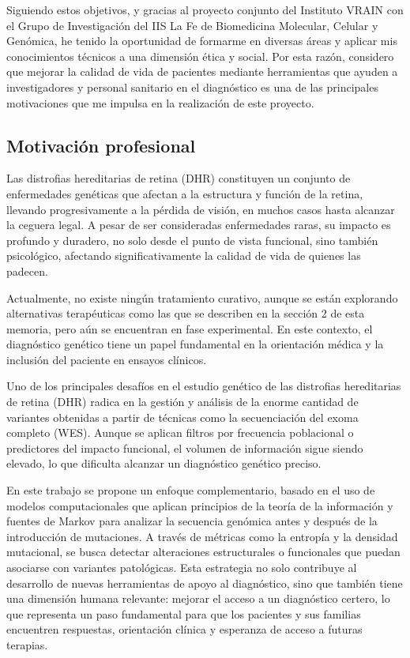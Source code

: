 \documentclass[11pt,spanish,listoffigures,listoftables]{tfgetsinf}
\begin{document}
Siguiendo estos objetivos, y gracias al proyecto conjunto del Instituto VRAIN con el Grupo de Investigación del \ac{IIS} La Fe de Biomedicina Molecular, Celular y Genómica, he tenido la oportunidad de formarme en diversas áreas y aplicar mis conocimientos técnicos a una dimensión ética y social. Por esta razón, considero que mejorar la calidad de vida de pacientes mediante herramientas que ayuden a investigadores y personal sanitario en el diagnóstico es una de las principales motivaciones que me impulsa en la realización de este proyecto. 

\subsection{Motivación profesional}
Las distrofias hereditarias de retina (\ac{DHR}) constituyen un conjunto de enfermedades genéticas que afectan a la estructura y función de la retina, llevando progresivamente a la pérdida de visión, en muchos casos hasta alcanzar la ceguera legal. A pesar de ser consideradas enfermedades raras, su impacto es profundo y duradero, no solo desde el punto de vista funcional, sino también psicológico, afectando significativamente la calidad de vida de quienes las padecen\cite{STO}.

Actualmente, no existe ningún tratamiento curativo, aunque se están explorando alternativas terapéuticas como las que se describen en la sección 2 de esta memoria, pero aún se encuentran en fase experimental. En este contexto, el diagnóstico genético tiene un papel fundamental en la orientación médica y la inclusión del paciente en ensayos clínicos\cite{HAN}.

Uno de los principales desafíos en el estudio genético de las distrofias hereditarias de retina (\ac{DHR}) radica en la gestión y análisis de la enorme cantidad de variantes obtenidas a partir de técnicas como la secuenciación del exoma completo (\ac{WES}). Aunque se aplican filtros por frecuencia poblacional o predictores del impacto funcional, el volumen de información sigue siendo elevado, lo que dificulta alcanzar un diagnóstico genético preciso\cite{DEC}.

En este trabajo se propone un enfoque complementario, basado en el uso de modelos computacionales que aplican principios de la teoría de la información y fuentes de Markov para analizar la secuencia genómica antes y después de la introducción de mutaciones. A través de métricas como la entropía y la densidad mutacional, se busca detectar alteraciones estructurales o funcionales que puedan asociarse con variantes patológicas. Esta estrategia no solo contribuye al desarrollo de nuevas herramientas de apoyo al diagnóstico, sino que también tiene una dimensión humana relevante: mejorar el acceso a un diagnóstico certero, lo que representa un paso fundamental para que los pacientes y sus familias encuentren respuestas, orientación clínica y esperanza de acceso a futuras terapias. 
\end{document}
